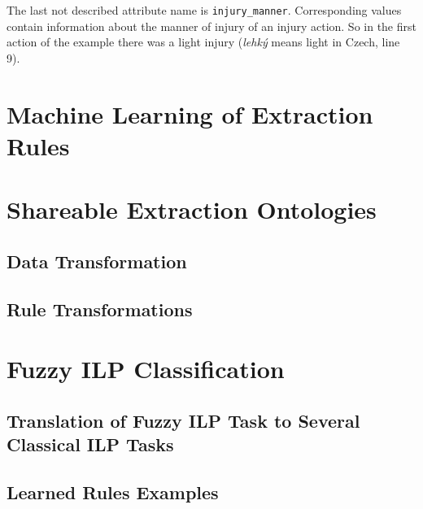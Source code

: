 The last not described attribute name is \verb+injury_manner+. Corresponding values contain information about the manner of injury of an injury action. So in the first action of the example there was a light injury (\emph{lehký} means light in Czech, line 9).








\section{Machine Learning of Extraction Rules}

\section{Shareable Extraction Ontologies}

\subsection{Data Transformation}

\subsection{Rule Transformations}

\section{Fuzzy ILP Classification}

\subsection{Translation of Fuzzy ILP Task to Several Classical ILP Tasks}

\subsection{Learned Rules Examples}
